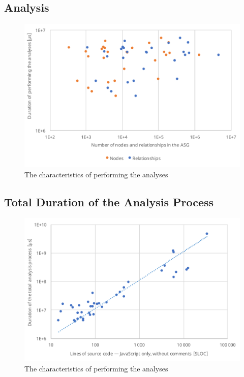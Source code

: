 \subsection{Analysis}

\begin{figure}[!htb]
	\centerfloat
	\includegraphics[width=\textwidth,clip]{figures/measurement-analysis-nodes-relationships.pdf}
	\caption{The characteristics of performing the analyses}
	\label{fig:measurement-analysis-nodes-relationships}
\end{figure}


\subsection{Total Duration of the Analysis Process}

\begin{figure}[!htb]
	\centerfloat
	\includegraphics[width=\textwidth,clip]{figures/measurement-totaltime-sloc.pdf}
	\caption{The characteristics of performing the analyses}
	\label{fig:measurement-totaltime-sloc}
\end{figure}

